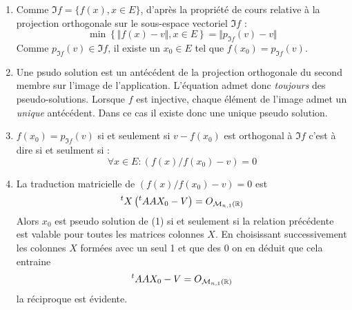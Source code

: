 \begin{enumerate}
 \item Comme $\Im f =\{f(x) , x \in E\}$, d'après la propriété de cours relative à la projection orthogonale sur le sous-espace vectoriel $\Im f$ :
\begin{displaymath}
 \min \left\lbrace \Vert f(x)-v \Vert , x\in E \right\rbrace = \Vert p_{\Im f}(v)-v \Vert 
\end{displaymath}
Comme $p_{\Im f}(v)\in \Im f$, il existe un $x_0\in E$ tel que $f(x_0)=p_{\Im f}(v)$.

\item Une psudo solution est un antécédent de la projection orthogonale du second membre sur l'image de l'application. L'équation admet donc \emph{toujours} des pseudo-solutions. Lorsque $f$ est injective, chaque élément de l'image admet un \emph{unique} antécédent. Dans ce cas il existe donc une unique pseudo solution.

\item $f(x_0)=p_{\Im f}(v)$ si et seulement si $v-f(x_0)$ est orthogonal à $\Im f$ c'est à dire si et seulment si :
\begin{displaymath}
 \forall x\in E : (f(x)/f(x_0)-v)=0
\end{displaymath}


\item La traduction matricielle de $(f(x)/f(x_0)-v)=0$ est
\begin{displaymath}
 ^tX \left( ^tA A X_0 - V \right) = O_{\mathcal M_{n,1}(\mathbb{R})} 
\end{displaymath}
Alors $x_0$ est pseudo solution de (1) si et seulement si la relation précédente est valable pour toutes les matrices colonnes $X$. En choisissant successivement les colonnes $X$ formées avec un seul 1 et que des 0 on en déduit que cela entraine 
\begin{displaymath}
  ^tA A X_0 - V  = O_{\mathcal M_{n,1}(\mathbb{R})} 
\end{displaymath}
la réciproque est évidente.


\end{enumerate}
